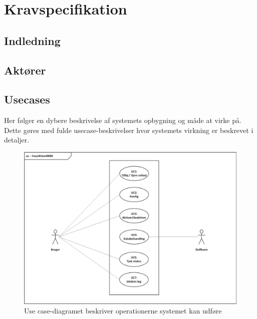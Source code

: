 \chapter{Kravspecifikation}

\section{Indledning}


\newpage
\section{Aktører}


\newpage
\section{Usecases}\label{header:usecases}

Her følger en dybere beskrivelse af systemets opbygning og måde at virke på. Dette gøres med fulde usecase-beskrivelser hvor systemets virkning er beskrevet i detaljer.

\begin{figure}[H] \centering
\vspace*{\fill}
\includegraphics[width=\textwidth]{filer/kravspec/visio/Usecase_Diagram}
\caption{Use case-diagramet beskriver operationerne systemet kan udføre}
\label{lab:usecasediagram}
\vspace*{\fill}
\end{figure}


